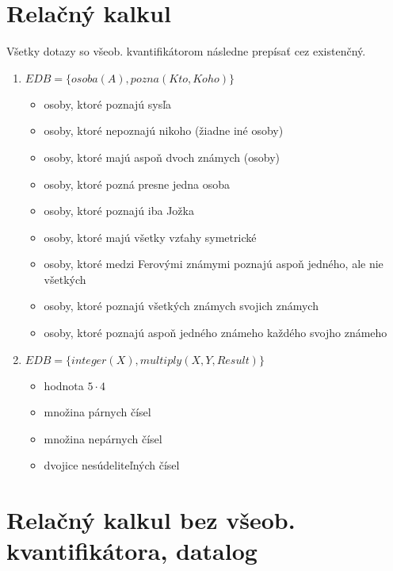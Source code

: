 \documentclass[10pt, a4paper]{article}
\begin{document}

\addtolength{\parskip}{0.5\baselineskip}

\pagestyle{empty}


\section{Relačný kalkul}

Všetky dotazy so všeob. kvantifikátorom následne prepísať cez existenčný.

\begin{enumerate}
\item 
$EDB = \{osoba(A), pozna(Kto, Koho)\}$
\begin{itemize}
    \item osoby, ktoré poznajú sysľa
    \item osoby, ktoré nepoznajú nikoho (žiadne iné osoby)
    \item osoby, ktoré majú aspoň dvoch známych (osoby)
    \item osoby, ktoré pozná presne jedna osoba
    \item osoby, ktoré poznajú iba Jožka
    \item osoby, ktoré majú všetky vzťahy symetrické
    \item osoby, ktoré medzi Ferovými známymi poznajú aspoň jedného, ale nie všetkých
    \item osoby, ktoré poznajú všetkých známych svojich známych
    \item osoby, ktoré poznajú aspoň jedného známeho každého svojho známeho
\end{itemize}

\item 
$EDB = \{integer(X), multiply(X, Y, Result)\}$
\begin{itemize}
    \item hodnota $5\cdot 4$
    \item množina párnych čísel
    \item množina nepárnych čísel
    \item dvojice nesúdeliteľných čísel
\end{itemize}

\end{enumerate}


\section{Relačný kalkul bez všeob. kvantifikátora, datalog}
\end{document}
